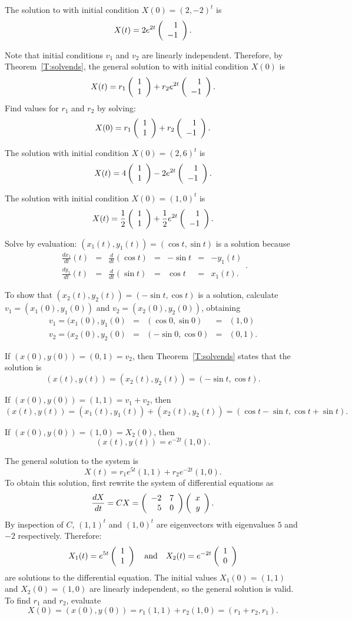  \ans The solution to  with initial condition
$X(0) = (2,-2)^t$ is 
\[
X(t) = 2e^{2t}\left(\begin{array}{r} 1 \\ -1\end{array}\right).
\]

\soln Note that initial conditions $v_1$ and $v_2$ are linearly
independent.  Therefore, by Theorem~\ref{T:solvends}, the general solution
to  with initial condition $X(0)$ is
\[
X(t) = r_1\left(\begin{array}{r} 1 \\ 1\end{array}\right) + r_2e^{2t}\left(\begin{array}{r} 1 \\ -1\end{array}\right).
\]
Find values for $r_1$ and $r_2$ by solving:
\begin{equation} \label{c6.1.06eq}
X(0) = r_1\left(\begin{array}{r} 1 \\ 1\end{array}\right) + r_2\left(\begin{array}{r} 1 \\ -1\end{array}\right).
\end{equation}

 The solution with initial condition $X(0) = (2,6)^t$ is 
\[
X(t) = 4\left(\begin{array}{r} 1 \\ 1\end{array}\right) - 2e^{2t}\left(\begin{array}{r} 1 \\ -1\end{array}\right).
\]


 The solution with initial condition $X(0) = (1,0)^t$ is
\[
X(t) = \frac{1}{2}\left(\begin{array}{r} 1 \\ 1\end{array}\right) + \frac{1}{2}e^{2t}\left(\begin{array}{r} 1 \\ -1\end{array}\right).
\]

\newpage
{}
Solve by evaluation:
$(x_1(t),y_1(t)) = (\cos t, \sin t)$
is a solution because
\[ \begin{array}{ccccccc}
\frac{dx_1}{dt}(t) & = & \frac{d}{dt}(\cos t) & = & -\sin t & = & -y_1(t)
\\ \frac{dy_1}{dt}(t) & = & \frac{d}{dt}(\sin t) & = & \cos t & = & x_1(t).
\end{array}. \]

 To show that $(x_2(t),y_2(t)) = (-\sin t, \cos t)$
is a solution, calculate $v_1 = (x_1(0),y_1(0))$ and
$v_2 = (x_2(0),y_2(0))$, obtaining
\[
\begin{array}{ccccl}
v_1 = (x_1(0),y_1(0) & = & (\cos 0,\sin 0) & = & (1,0) \\
v_2 = (x_2(0),y_2(0) & = & (-\sin 0,\cos 0) & = & (0,1).
\end{array}
\]

If $(x(0),y(0)) = (0,1) = v_2$, then Theorem~\ref{T:solvends} states
that the solution is
\[
(x(t),y(t)) = (x_2(t),y_2(t)) = (-\sin t,\cos t).
\]

If $(x(0),y(0)) = (1,1) = v_1 + v_2$, then
\[
(x(t),y(t)) = (x_1(t),y_1(t)) + (x_2(t),y_2(t)) =
(\cos t - \sin t, \cos t + \sin t).
\]

\ans If $(x(0),y(0)) = (1,0) = X_2(0)$, then
\[
(x(t),y(t)) = e^{-2t}(1,0).
\]

\soln The general solution to the system is
\[
X(t) = r_1e^{5t}(1,1) + r_2e^{-2t}(1,0).
\]
To obtain this solution, first rewrite the system of differential
equations as
\[
\frac{dX}{dt} = CX = \left(\begin{array}{rr} -2 & 7\\ 5 &0\end{array}\right)\left(\begin{array}{r} x \\ y\end{array}\right).
\]
By inspection of $C$, $(1,1)^t$ and $(1,0)^t$ are eigenvectors with
eigenvalues $5$ and $-2$ respectively.  Therefore:
\[
X_1(t) = e^{5t}\left(\begin{array}{r} 1 \\ 1\end{array}\right) \quad\mbox{and}\quad X_2(t) = e^{-2t}\left(\begin{array}{r} 1 \\ 0\end{array}\right)
\]
are solutions to the differential equation.
The initial values $X_1(0) = (1,1)$ and $X_2(0) = (1,0)$ are linearly
independent, so the general solution is valid.
To find $r_1$ and $r_2$, evaluate
\[
X(0) = (x(0),y(0)) = r_1(1,1) + r_2(1,0) = (r_1 + r_2,r_1).
\]

